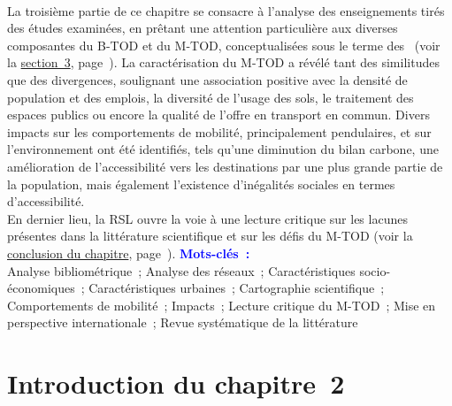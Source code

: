 \begin{refsegment}
\begin{tcolorbox}
{    \\
La troisième partie de ce chapitre se consacre à l'analyse des enseignements tirés des études examinées, en prêtant une attention particulière aux diverses composantes du \acrshort{B-TOD} et du \acrshort{M-TOD}, conceptualisées sous le terme des ~(voir la \hyperref[chap2:caracterisation-btod-environnement-urbain-choix-individuels]{section~3}, page~\pageref{chap2:caracterisation-btod-environnement-urbain-choix-individuels}). La caractérisation du \acrshort{M-TOD} a révélé tant des similitudes que des divergences, soulignant une association positive avec la densité de population et des emplois, la diversité de l'usage des sols, le traitement des espaces publics ou encore la qualité de l'offre en transport en commun. Divers impacts sur les comportements de mobilité, principalement pendulaires, et sur l'environnement ont été identifiés, tels qu'une diminution du bilan carbone, une amélioration de l'\gls{accessibilité} vers les destinations par une plus grande partie de la population, mais également l'existence d'inégalités sociales en termes d'accessibilité.%
    \\
En dernier lieu, la \acrshort{RSL} ouvre la voie à une lecture critique sur les lacunes présentes dans la littérature scientifique et sur les défis du \acrshort{M-TOD} (voir la \hyperref[chap2:conclusion]{conclusion du chapitre}, page~\pageref{chap2:conclusion}).%
    }
    \tcblower
\Large{\textbf{\textcolor{blue}{Mots-clés~:}}}
    \\
    \small{
Analyse bibliométrique~;
Analyse des réseaux~;
Caractéristiques socio-économiques~;
Caractéristiques urbaines~;
Cartographie scientifique~;
Comportements de mobilité~;
Impacts~;
Lecture critique du M-TOD~;
Mise en perspective internationale~;
Revue systématique de la littérature
    }
    \end{tcolorbox}

    \newpage
\section*{Introduction du chapitre~2
    \label{chap2:introduction}
    }


\end{refsegment}

